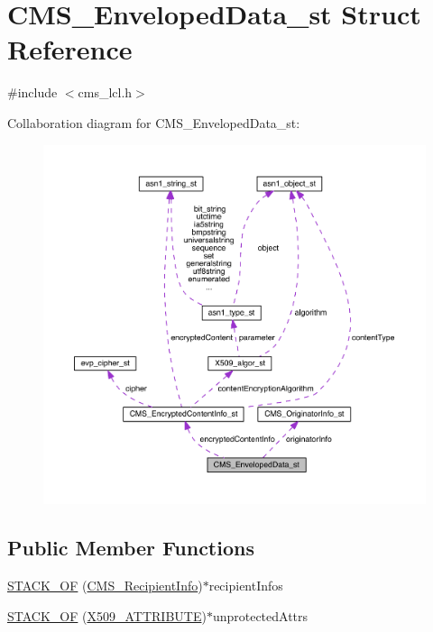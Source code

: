 \hypertarget{struct_c_m_s___enveloped_data__st}{}\section{C\+M\+S\+\_\+\+Enveloped\+Data\+\_\+st Struct Reference}
\label{struct_c_m_s___enveloped_data__st}


{\ttfamily \#include $<$cms\+\_\+lcl.\+h$>$}



Collaboration diagram for C\+M\+S\+\_\+\+Enveloped\+Data\+\_\+st\+:\nopagebreak
\begin{figure}[H]
\begin{center}
\leavevmode
\includegraphics[width=350pt]{struct_c_m_s___enveloped_data__st__coll__graph}
\end{center}
\end{figure}
\subsection*{Public Member Functions}
\begin{DoxyCompactItemize}
\item 
\hyperlink{struct_c_m_s___enveloped_data__st_a8119f9ab1b20c31bc1dbb8365f0325eb}{S\+T\+A\+C\+K\+\_\+\+OF} (\hyperlink{crypto_2cms_2cms_8h_ac5c9066f9d23a39dc973dd8821304756}{C\+M\+S\+\_\+\+Recipient\+Info})$\ast$recipient\+Infos
\item 
\hyperlink{struct_c_m_s___enveloped_data__st_ad46bfc9f05be7790c016ea9af01e5280}{S\+T\+A\+C\+K\+\_\+\+OF} (\hyperlink{crypto_2x509_2x509_8h_aa4f1a62a9d2dd8cb6780fe2713737c0f}{X509\+\_\+\+A\+T\+T\+R\+I\+B\+U\+TE})$\ast$unprotected\+Attrs
\end{DoxyCompactItemize}
